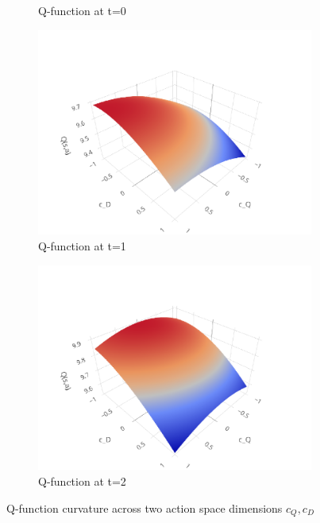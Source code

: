 \begin{figure}[hbt]
\begin{subfigure}[b]{0.48\textwidth}
    \caption{Q-function at t=0}
    \label{fig:qf-t0}
  \end{subfigure}
  \begin{subfigure}[b]{0.48\textwidth}
    \centering
    \includegraphics[width=\textwidth]{images/frame_1.pdf}
    \caption{Q-function at t=1}
    \label{fig:qf-t1}
  \end{subfigure}
  \begin{subfigure}[b]{0.48\textwidth}
    \centering
    \includegraphics[width=\textwidth]{images/frame_2.pdf}
    \caption{Q-function at t=2}
    \label{fig:qf-t2}
  \end{subfigure}
  \caption{Q-function curvature across two action space dimensions $c_Q, c_D$}
  \label{fig:qf}
\end{figure}

